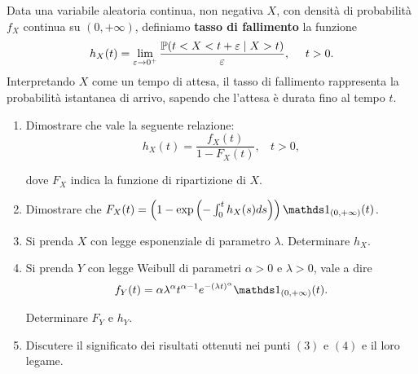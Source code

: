 Data una variabile aleatoria continua, non negativa $X$, con densità di probabilità $f_{X}$ continua su $\left(0,+\infty \right)$, definiamo \textbf{tasso di fallimento} la funzione
\begin{equation*}
h_{X}(t) =\lim_{\varepsilon \rightarrow 0^{+}}\frac{\mathbb{P}(t< X< t+\varepsilon \mid X >t)}{\varepsilon } ,\ \ \ \ t >0.
\end{equation*}
Interpretando $X$ come un tempo di attesa, il tasso di fallimento rappresenta la probabilità istantanea di arrivo, sapendo che l'attesa è durata fino al tempo $t$.
\begin{enumerate}
\item Dimostrare che vale la seguente relazione:\begin{equation*}
h_{X}(t) =\frac{f_{X}(t)}{1-F_{X}(t)} ,\ \ \ \ t >0,
\end{equation*}

dove $F_{X}$ indica la funzione di ripartizione di $X$.
\item Dimostrare che $F_{X}(t) =\left(1-\exp\left(-\int_{0}^{t} h_{X}(s) ds\right)\right) \Ind_{(0,+\infty)}(t)$.
\item Si prenda $X$ con legge esponenziale di parametro $\lambda $. Determinare $h_{X}$.
\item Si prenda $Y$ con legge Weibull di parametri $\alpha  >0$ e $\lambda  >0$, vale a dire
\begin{equation*}
f_{Y}(t) =\alpha \lambda^{\alpha } t^{\alpha -1} e^{-(\lambda t)^{\alpha }} \Ind_{(0,+\infty)}(t) .
\end{equation*}

Determinare $F_{Y}$ e $h_{Y}$.
\item Discutere il significato dei risultati ottenuti nei punti $(3)$ e $(4)$ e il loro legame.
\end{enumerate}
\Esercizio{}

